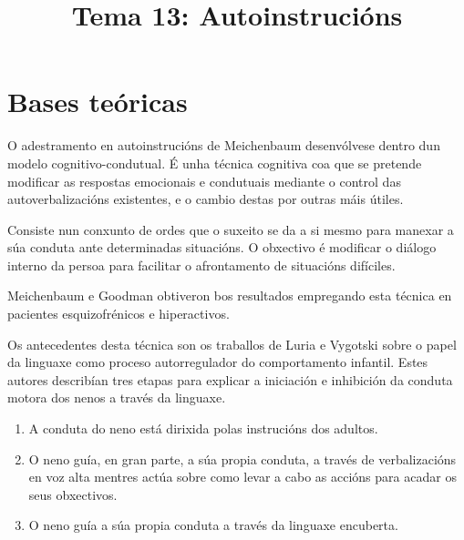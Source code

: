 \documentclass[a4paper,11pt]{article}
\title{Tema 13: Autoinstrucións}
\date{}
\begin{document}
   

\maketitle 

\section{Bases teóricas}
O adestramento en autoinstrucións de Meichenbaum desenvólvese dentro dun modelo cognitivo-condutual. É unha técnica cognitiva coa que se pretende modificar as respostas emocionais e condutuais mediante o control das autoverbalizacións existentes, e o cambio destas por outras máis útiles.

Consiste nun conxunto de ordes que o suxeito se da a si mesmo para manexar a súa conduta ante determinadas situacións. O obxectivo é modificar o diálogo interno da persoa para facilitar o afrontamento de situacións difíciles. 

Meichenbaum e Goodman obtiveron bos resultados empregando esta técnica en pacientes esquizofrénicos e hiperactivos.

Os antecedentes desta técnica son os traballos de Luria e Vygotski sobre o papel da linguaxe como proceso autorregulador do comportamento infantil. Estes autores describían tres etapas para explicar a iniciación e inhibición da conduta motora dos nenos a través da linguaxe. 
\begin{enumerate}
	\item A conduta do neno está dirixida polas instrucións dos adultos.
	\item O neno guía, en gran parte, a súa propia conduta, a través de verbalizacións en voz alta 
	mentres actúa sobre como levar a cabo as accións para acadar os seus obxectivos.
	\item O neno guía a súa propia conduta a través da linguaxe encuberta. 
\end{enumerate}
\end{document}
